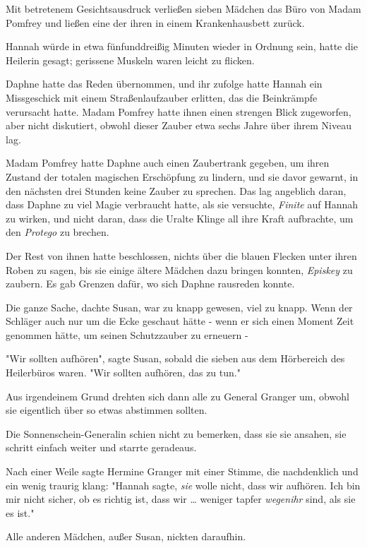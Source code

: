 {Mit betretenem Gesichtsausdruck verließen sieben Mädchen das Büro von Madam Pomfrey und ließen eine der ihren in einem Krankenhausbett zurück.

Hannah würde in etwa fünfunddreißig Minuten wieder in Ordnung sein, hatte die Heilerin gesagt; gerissene Muskeln waren leicht zu flicken.

Daphne hatte das Reden übernommen, und ihr zufolge hatte Hannah ein Missgeschick mit einem Straßenlaufzauber erlitten, das die Beinkrämpfe verursacht hatte. Madam Pomfrey hatte ihnen einen strengen Blick zugeworfen, aber nicht diskutiert, obwohl dieser Zauber etwa sechs Jahre über ihrem Niveau lag.

Madam Pomfrey hatte Daphne auch einen Zaubertrank gegeben, um ihren Zustand der totalen magischen Erschöpfung zu lindern, und sie davor gewarnt, in den nächsten drei Stunden keine Zauber zu sprechen. Das lag angeblich daran, dass Daphne zu viel Magie verbraucht hatte, als sie versuchte, \emph{Finite} auf Hannah zu wirken, und nicht daran, dass die Uralte Klinge all ihre Kraft aufbrachte, um den \emph{Protego} zu brechen.

Der Rest von ihnen hatte beschlossen, nichts über die blauen Flecken unter ihren Roben zu sagen, bis sie einige ältere Mädchen dazu bringen konnten, \emph{Episkey} zu zaubern. Es gab Grenzen dafür, wo sich Daphne rausreden konnte.

Die ganze Sache, dachte Susan, war zu knapp gewesen, viel zu knapp. Wenn der Schläger auch nur um die Ecke geschaut hätte - wenn er sich einen Moment Zeit genommen hätte, um seinen Schutzzauber zu erneuern -

"Wir sollten aufhören", sagte Susan, sobald die sieben aus dem Hörbereich des Heilerbüros waren. "Wir sollten aufhören, das zu tun."

Aus irgendeinem Grund drehten sich dann alle zu General Granger um, obwohl sie eigentlich über so etwas abstimmen sollten.

Die Sonnenschein-Generalin schien nicht zu bemerken, dass sie sie ansahen, sie schritt einfach weiter und starrte geradeaus.

Nach einer Weile sagte Hermine Granger mit einer Stimme, die nachdenklich und ein wenig traurig klang: "Hannah sagte, \emph{sie} wolle nicht, dass wir aufhören. Ich bin mir nicht sicher, ob es richtig ist, dass wir … weniger tapfer \emph{wegenihr} sind, als sie es ist."

Alle anderen Mädchen, außer Susan, nickten daraufhin.

}
